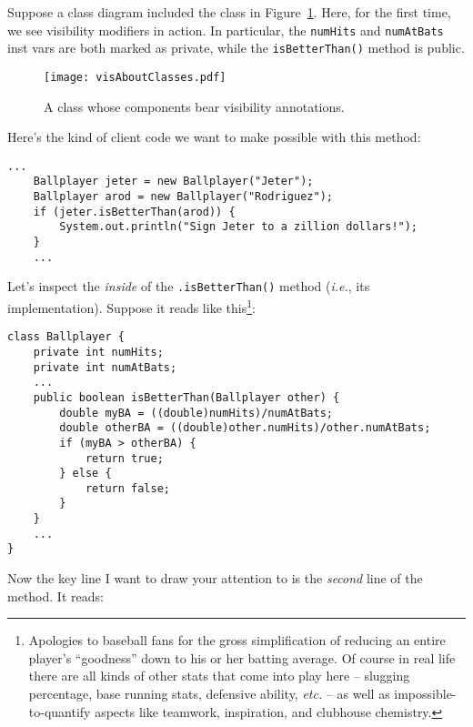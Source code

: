 Suppose a class diagram included the class in
Figure~\ref{fig:visAboutClasses}. Here, for the first time, we see visibility
modifiers in action. In particular, the \texttt{numHits} and
\texttt{numAtBats} inst vars are both marked as private, while the
\texttt{isBetterThan()} method is public.

\begin{figure}[h]
\centering
\bigskip
\texttt{[image: visAboutClasses.pdf]}
\medskip
\caption{A class whose components bear visibility annotations.}
\label{fig:visAboutClasses}
\bigskip
\end{figure}

Here's the kind of client code we want to make possible with this method:

\vspace{-.15in}
\begin{Verbatim}[fontsize=\footnotesize,samepage=true,frame=single]
    ...
    Ballplayer jeter = new Ballplayer("Jeter");
    Ballplayer arod = new Ballplayer("Rodriguez");
    if (jeter.isBetterThan(arod)) {
        System.out.println("Sign Jeter to a zillion dollars!");
    }
    ...
\end{Verbatim}

\pagebreak
Let's inspect the \textit{inside} of the \texttt{.isBetterThan()} method
(\textit{i.e.}, its implementation). Suppose it reads like
this\footnote{Apologies to baseball fans for the gross simplification of
reducing an entire player's ``goodness'' down to his or her batting average. Of
course in real life there are all kinds of other stats that come into play
here -- slugging percentage, base running stats, defensive ability,
\textit{etc.} -- as well as impossible-to-quantify aspects like teamwork,
inspiration, and clubhouse chemistry.}:

\begin{Verbatim}[fontsize=\footnotesize,samepage=true,frame=single]
class Ballplayer {
    private int numHits;
    private int numAtBats;
    ...
    public boolean isBetterThan(Ballplayer other) {
        double myBA = ((double)numHits)/numAtBats;
        double otherBA = ((double)other.numHits)/other.numAtBats;
        if (myBA > otherBA) {
            return true;
        } else {
            return false;
        }
    }
    ...
}
\end{Verbatim}

Now the key line I want to draw your attention to is the \textit{second} line
of the method. It reads:

